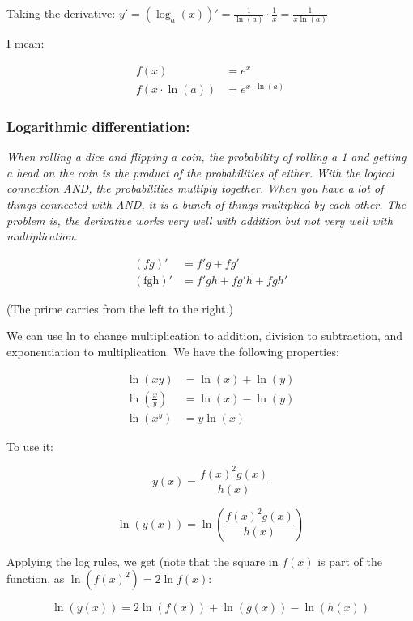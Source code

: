 \documentclass[12pt]{article}
\theoremstyle{plain}
\theoremstyle{remark}
\theoremstyle{definition}
\begin{document}
Taking the derivative:
\(y' = \left( \log_{a}(x) \right)' = \frac{1}{\ln(a)} \cdot \frac{1}{x} = \frac{1}{x\ln(a)}\)

I mean:

\begin{align*}
f(x) &= e^{x} \\
f\left( x \cdot \ln(a) \right) &= e^{x \cdot \ln(a)}
\end{align*}



\subsubsection{Logarithmic
differentiation:}

\emph{When rolling a dice and flipping a coin, the probability of
rolling a 1 and getting a head on the coin is the product of the
probabilities of either. With the logical connection AND, the
probabilities multiply together. When you have a lot of things connected
with AND, it is a bunch of things multiplied by each other. The problem
is, the derivative works very well with addition but not very well with
multiplication.}

\begin{align*}
\left( fg \right)' &= f'g + fg' \\
\left( \text{fgh} \right)' &= f'gh + fg'h + fgh'
\end{align*}


(The prime carries from the left to the right.)

We can use ln to change multiplication to addition, division to
subtraction, and exponentiation to multiplication. We have the following
properties:

\begin{align*}
\ln\left( xy \right) &= \ln(x) + \ln(y) \\
\ln\left( \frac{x}{y} \right) &= \ln(x) - \ln(y) \\
\ln\left( x^{y} \right) &= y\ln(x)
\end{align*}


To use it:

\[y(x) = \frac{f(x)^{2}g(x)}{h(x)}
\]

\[\ln\left( y(x) \right) = \ln\left( \frac{f(x)^{2}g(x)}{h(x)} \right)\]

Applying the log rules, we get (note that the square in \(f(x)\) is part
of the function, as \(\ln\left( f(x)^{2} \right) = 2\ln{f(x)}\):

\[\ln\left( y(x) \right) = 2\ln\left( f(x) \right) + \ln\left( g(x) \right) - \ln\left( h(x) \right)\]
\end{document}
